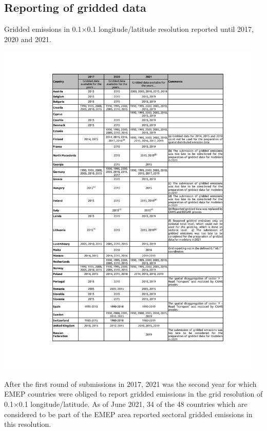 \subsection{Reporting of gridded data}
\label{sec:griddedemis}

\begin{table} 
  \caption{Gridded emissions in 0.1{\degrees}$\times$0.1{\degrees} longitude/latitude resolution reported until 2017, 2020 and 2021.}
\centering
{\includegraphics*[viewport=115 65 550 740 ,clip,width=0.95\textwidth]{FIGS_CEIP/Table2.pdf}}
\label{tab:emis01degreported}  
\end{table}


After the first round of submissions in 2017, 2021 was the second year for which EMEP countries were obliged to report gridded emissions in the grid resolution of 0.1{\degrees}$\times$0.1{\degrees} lon\-gi\-tude/la\-ti\-tude. As of June 2021, 34 of the 48 countries which are considered to be part of the EMEP area reported sectoral gridded emissions in this resolution.


